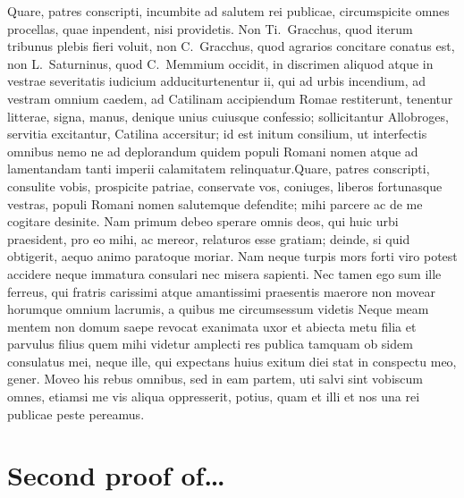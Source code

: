 \documentclass[a4paper,12pt,twoside,swedish]{report}
\begin{document}
Quare, patres conscripti, incumbite ad salutem rei publicae,
circumspicite omnes procellas, quae inpendent, nisi providetis. Non
Ti.~Gracchus, quod iterum tribunus plebis fieri voluit, non
C.~Gracchus, quod agrarios concitare conatus est, non L.~Saturninus,
quod C.~Memmium occidit, in discrimen aliquod atque in vestrae
severitatis iudicium adduciturtenentur ii, qui ad urbis incendium, ad
vestram omnium caedem, ad Catilinam accipiendum Romae restiterunt,
tenentur litterae, signa, manus, denique unius cuiusque confessio;
sollicitantur Allobroges, servitia excitantur, Catilina accersitur; id
est initum consilium, ut interfectis omnibus nemo ne ad deplorandum
quidem populi Romani nomen atque ad lamentandam tanti imperii
calamitatem relinquatur.Quare, patres conscripti, consulite vobis, prospicite patriae,
conservate vos, coniuges, liberos fortunasque vestras, populi Romani
nomen salutemque defendite; mihi parcere ac de me cogitare desinite. Nam
primum debeo sperare omnis deos, qui huic urbi praesident, pro eo mihi,
ac mereor, relaturos esse gratiam; deinde, si quid obtigerit, aequo
animo paratoque moriar. Nam neque turpis mors forti viro potest accidere
neque immatura consulari nec misera sapienti. Nec tamen ego sum ille
ferreus, qui fratris carissimi atque amantissimi praesentis maerore non
movear horumque omnium lacrumis, a quibus me circumsessum videtis Neque
meam mentem non domum saepe revocat exanimata uxor et abiecta metu filia
et parvulus filius quem mihi videtur amplecti res publica tamquam ob
sidem consulatus mei, neque ille, qui expectans huius exitum diei stat
in conspectu meo, gener. Moveo his rebus omnibus, sed in eam partem, uti
salvi sint vobiscum omnes, etiamsi me vis aliqua oppresserit, potius,
quam et illi et nos una rei publicae peste pereamus.

\chapter{Second proof of\dots}

\label{app:proof2}

\thispagestyle{empty}
\end{document}
